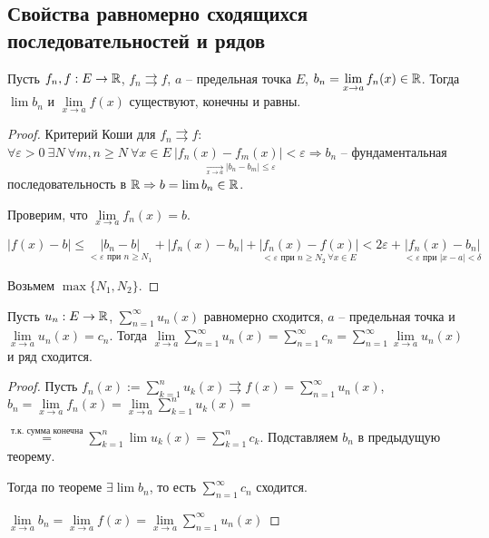 \subsection{Свойства равномерно сходящихся последовательностей и рядов}

\begin{theorem}
    Пусть $f_n, f: E\rightarrow \mathbb{R}$, $f_n\rightrightarrows f$, $a$ – предельная точка $E$, $b_n=\lim\limits_{x\rightarrow a} f_n(x)\in \mathbb{R}$. Тогда $\lim b_n$ и $\lim\limits_{x\rightarrow a} f(x)$ существуют, конечны и равны.
\end{theorem}

\begin{proof}
    Критерий Коши для $f_n\rightrightarrows f$: $\forall \varepsilon > 0\ \exists N\ \forall m, n\geq N\ \forall x\in E\ 
    \underset{\underset{x\rightarrow a}{\rightarrow}|b_n-b_m|\leq\varepsilon}{|f_n(x)-f_m(x)|<\varepsilon}\Rightarrow b_n$ – фундаментальная последовательность в $\mathbb{R}\Rightarrow b=\lim b_n\in \mathbb{R}$.

    Проверим, что $\lim\limits_{x\rightarrow a} f_n(x) =b$.

    $|f(x)-b|\leq \underset{<\varepsilon \text{ при $n\geq N_1$}}{|b_n-b|} + |f_n(x)-b_n|+\underset{<\varepsilon \text{ при $n\geq N_2\ \forall x\in E$}}{|f_n(x)-f(x)|}<2\varepsilon+\underset{<\varepsilon \text{ при $|x-a|<\delta$}}{|f_n(x)-b_n|}$

    Возьмем $\max\{N_1, N_2\}$.
\end{proof}

\begin{theorem}
    Пусть $u_n: E\rightarrow \mathbb{R}$, $\sum\limits_{n=1}^\infty u_n(x)$ равномерно сходится, $a$ – предельная точка и $\lim\limits_{x\rightarrow a} u_n(x)=c_n$. Тогда $\lim\limits_{x\rightarrow a}\sum\limits_{n=1}^\infty u_n(x) = \sum\limits_{n=1}^\infty c_n=\sum\limits_{n=1}^\infty \lim\limits_{x\rightarrow a} u_n(x)$ и ряд сходится.
\end{theorem}

\begin{proof}
    Пусть $f_n(x):=\sum\limits_{k=1}^n u_k(x)\rightrightarrows f(x)=\sum\limits_{n=1}^\infty u_n(x)$, $b_n=\lim\limits_{x\rightarrow a}f_n(x) =\lim\limits_{x\rightarrow a} \sum\limits_{k=1}^n u_k(x)=$
    
    $\overset{\text{т.к. сумма конечна}}{=}\sum\limits_{k=1}^n \lim u_k(x)=\sum\limits_{k=1}^n c_k$. Подставляем $b_n$ в предыдущую теорему.

    Тогда по теореме $\exists \lim b_n$, то есть $\sum\limits_{n=1}^\infty c_n$ сходится.

    $\lim\limits_{x\rightarrow a}b_n=\lim\limits_{x\rightarrow a}f(x)=\lim\limits_{x\rightarrow a} \sum\limits_{n=1}^\infty u_n(x)$
\end{proof}


